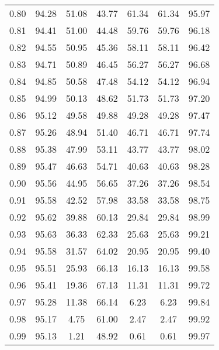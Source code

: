 \begin{tabular}{|c|c|c|c|c|c|c|}
      0.80 &     94.28 &     51.08 &      43.77 &   61.34 &      61.34 &         95.97 \\
      0.81 &     94.41 &     51.00 &      44.48 &   59.76 &      59.76 &         96.18 \\
      0.82 &     94.55 &     50.95 &      45.36 &   58.11 &      58.11 &         96.42 \\
      0.83 &     94.71 &     50.89 &      46.45 &   56.27 &      56.27 &         96.68 \\
      0.84 &     94.85 &     50.58 &      47.48 &   54.12 &      54.12 &         96.94 \\
      0.85 &     94.99 &     50.13 &      48.62 &   51.73 &      51.73 &         97.20 \\
      0.86 &     95.12 &     49.58 &      49.88 &   49.28 &      49.28 &         97.47 \\
      0.87 &     95.26 &     48.94 &      51.40 &   46.71 &      46.71 &         97.74 \\
      0.88 &     95.38 &     47.99 &      53.11 &   43.77 &      43.77 &         98.02 \\
      0.89 &     95.47 &     46.63 &      54.71 &   40.63 &      40.63 &         98.28 \\
      0.90 &     95.56 &     44.95 &      56.65 &   37.26 &      37.26 &         98.54 \\
      0.91 &     95.58 &     42.52 &      57.98 &   33.58 &      33.58 &         98.75 \\
      0.92 &     95.62 &     39.88 &      60.13 &   29.84 &      29.84 &         98.99 \\
      0.93 &     95.63 &     36.33 &      62.33 &   25.63 &      25.63 &         99.21 \\
      0.94 &     95.58 &     31.57 &      64.02 &   20.95 &      20.95 &         99.40 \\
      0.95 &     95.51 &     25.93 &      66.13 &   16.13 &      16.13 &         99.58 \\
      0.96 &     95.41 &     19.36 &      67.13 &   11.31 &      11.31 &         99.72 \\
      0.97 &     95.28 &     11.38 &      66.14 &    6.23 &       6.23 &         99.84 \\
      0.98 &     95.17 &      4.75 &      61.00 &    2.47 &       2.47 &         99.92 \\
      0.99 &     95.13 &      1.21 &      48.92 &    0.61 &       0.61 &         99.97 \\
\bottomrule
\end{tabular}
